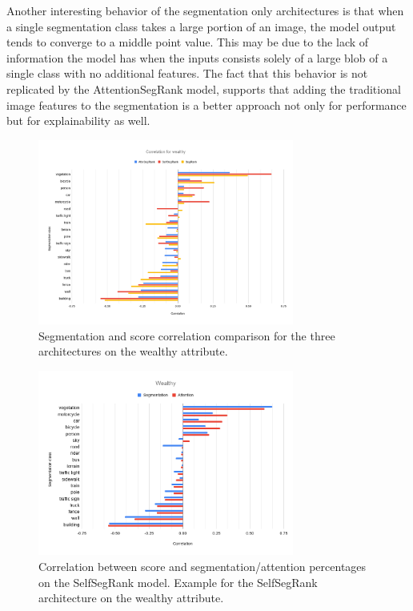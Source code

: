 Another interesting behavior of the segmentation only architectures is
that when a single segmentation class takes a large portion of an image,
the model output tends to converge to a middle point value. This may be due to the lack of
information the model has when the inputs consists solely of a large  blob of a single class with no
additional features. The fact that this behavior is not replicated by the AttentionSegRank model, supports
that adding the traditional image features to the segmentation is a better approach not only for performance
but for explainability as well.

\begin{figure}[ht]
	\begin{center}
	\includegraphics[width=0.75\textwidth]{./figures/correlation_comparison.png}
	\caption[Correlation comparison]{
		Segmentation and score correlation comparison for the three architectures on the wealthy
		attribute.
        }
	\label{fig:correlation_comparison}
	\end{center}
\end{figure}

\begin{figure}[ht]
	\begin{center}
	\includegraphics[width=0.75\textwidth]{./figures/selfsegrank_correlation.png}
	\caption[SelfSegRank Correlation]{
		Correlation between score and segmentation/attention percentages on the
		SelfSegRank model. Example for the SelfSegRank architecture on the wealthy attribute.
        }
	\label{fig:correlation_selfsegrank}
	\end{center}
\end{figure}

